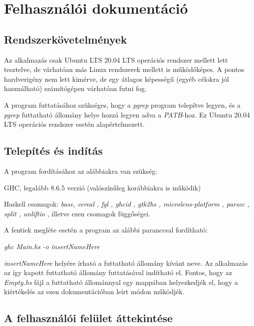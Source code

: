 \chapter{Felhasználói dokumentáció} %
\label{ch:user}

\section{Rendszerkövetelmények}

Az alkalmazás csak Ubuntu LTS 20.04 LTS operációs rendszer mellett lett tesztelve, de várhatóan más Linux rendszerek mellett is működőképes. A pontos hardverigény nem lett kimérve, de egy átlagos képességű (egyéb célokra jól használható) számítógépen várhatóan futni fog.

A program futtatásához szükséges, hogy a \textit{pgrep} program telepítve legyen, és a \textit{pgrep} futtatható állomány helye hozzá legyen adva a \textit{PATH}-hoz. Ez Ubuntu 20.04 LTS operációs rendszer esetén alapértelmezett.

\section{Telepítés és indítás}

A program fordításához az alábbiakra van szükség:
\begin{compactenum}
	\item GHC, legalább 8.6.5 verzió (valószínűleg korábbiakra is működik)
	\item Haskell csomagok: \textit{base, cereal \cite{cereal}, fgl \cite{fgl}, ghcid \cite{ghcid}, gtk2hs \cite{gtk2hs}, microlens-platform \cite{microlens}, parsec \cite{parsec}, split \cite{split}, unliftio \cite{unliftio}}, illetve ezen csomagok függőségei. 
\end{compactenum}

A fentiek megléte esetén a program az alábbi paranccsal fordítható: 

\textit{ghc Main.hs -o insertNameHere}

\textit{insertNameHere} helyére írható a futtatható állomány kívánt neve. Az alkalmazás az így kapott futtatható állomány futtatásával indítható el. Fontos, hogy az \textit{Empty.hs} fájl a futtatható állománnyal egy mappában helyezkedjék el, hogy a kiértékelés az ezen dokumentációban leírt módon működjék.

\section{A felhasználói felület áttekintése}

